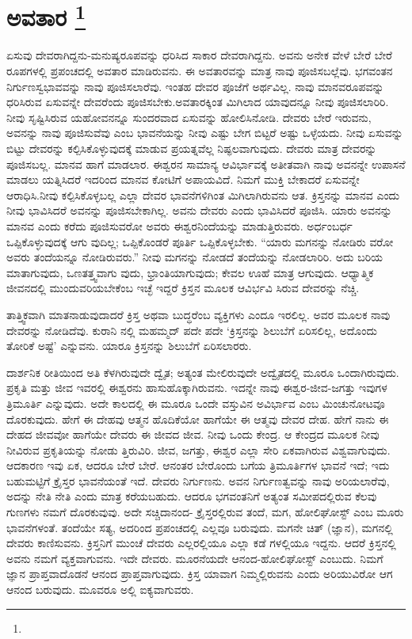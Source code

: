 
\chapter[ಅವತಾರ ]{ಅವತಾರ \protect\footnote{}}

ಏಸುವು ದೇವರಾಗಿದ್ದನು-ಮನುಷ್ಯರೂಪವನ್ನು ಧರಿಸಿದ ಸಾಕಾರ ದೇವರಾಗಿದ್ದನು. ಅವನು ಅನೇಕ ವೇಳೆ ಬೇರೆ ಬೇರೆ ರೂಪಗಳಲ್ಲಿ ಪ್ರಪಂಚದಲ್ಲಿ ಅವತಾರ ಮಾಡಿರುವನು. ಈ ಅವತಾರವನ್ನು ಮಾತ್ರ ನಾವು ಪೂಜಿಸಬಲ್ಲೆವು. ಭಗವಂತನ ನಿರ್ಗುಣಸ್ವಭಾವವನ್ನು ನಾವು ಪೂಜಿಸಲಾರೆವು. ಇಂತಹ ದೇವರ ಪೂಜೆಗೆ ಅರ್ಥವಿಲ್ಲ. ನಾವು ಮಾನವರೂಪವನ್ನು ಧರಿಸಿರುವ ಏಸುವನ್ನೇ ದೇವರೆಂದು ಪೂಜಿಸಬೇಕು.ಅವತಾರಕ್ಕಿಂತ ಮಿಗಿಲಾದ ಯಾವುದನ್ನೂ ನೀವು ಪೂಜಿಸಲಾರಿರಿ. ನೀವು ಸೃಷ್ಟಿಸಿರುವ ಯಹೋವನನ್ನೂ ಸುಂದರವಾದ ಏಸುವನ್ನು ಹೋಲಿಸಿನೋಡಿ. ದೇವರು ಬೇರೆ ಇರುವನು, ಅವನನ್ನು ನಾವು ಪೂಜಿಸುವೆವು ಎಂಬ ಭಾವನೆಯನ್ನು ನೀವು ಎಷ್ಟು ಬೇಗ ಬಿಟ್ಟರೆ ಅಷ್ಟು ಒಳ್ಳೆಯದು. ನೀವು ಏಸುವನ್ನು ಬಿಟ್ಟು ದೇವರನ್ನು ಕಲ್ಪಿಸಿಕೊಳ್ಳುವುದಕ್ಕೆ ಮಾಡುವ ಪ್ರಯತ್ನವೆಲ್ಲ ನಿಷ್ಫಲವಾಗುವುದು. ದೇವರು ಮಾತ್ರ ದೇವರನ್ನು ಪೂಜಿಸಬಲ್ಲ. ಮಾನವ ಹಾಗೆ ಮಾಡಲಾರ. ಈಶ್ವರನ ಸಾಮಾನ್ಯ ಆವಿರ್ಭಾವಕ್ಕೆ ಅತೀತವಾಗಿ ನಾವು ಅವನನ್ನೇ ಉಪಾಸನೆ ಮಾಡಲು ಯತ್ನಿಸಿದರೆ ಇದರಿಂದ ಮಾನವ ಕೋಟಿಗೆ ಅಪಾಯವಿದೆ. ನಿಮಗೆ ಮುಕ್ತಿ ಬೇಕಾದರೆ ಏಸುವನ್ನೇ ಆರಾಧಿಸಿ.ನೀವು ಕಲ್ಪಿಸಿಕೊಳ್ಳಬಲ್ಲ ಎಲ್ಲಾ ದೇವರ ಭಾವನೆಗಳಿಗಿಂತ ಮಿಗಿಲಾಗಿರುವನು ಆತ. ಕ್ರಿಸ್ತನನ್ನು ಮಾನವ ಎಂದು ನೀವು ಭಾವಿಸಿದರೆ ಅವನನ್ನು ಪೂಜಿಸಬೇಕಾಗಿಲ್ಲ. ಅವನು ದೇವರು ಎಂದು ಭಾವಿಸಿದರೆ ಪೂಜಿಸಿ. ಯಾರು ಅವನನ್ನು ಮಾನವ ಎಂದು ಕರೆದು ಪೂಜಿಸುವರೋ ಅವರು ಈಶ್ವರನಿಂದೆಯನ್ನು ಮಾಡುತ್ತಿರುವರು. ಅರ್ಧಂಬರ್ಧ ಒಪ್ಪಿಕೊಳ್ಳುವುದಕ್ಕೆ ಆಗು ವುದಿಲ್ಲ; ಒಪ್ಪಿಕೊಂಡರೆ ಪೂರ್ತಿ ಒಪ್ಪಿಕೊಳ್ಳಬೇಕು. “ಯಾರು ಮಗನನ್ನು ನೋಡಿರು ವರೋ ಅವರು ತಂದೆಯನ್ನೂ ನೋಡಿರುವರು.” ನೀವು ಮಗನನ್ನು ನೋಡದೆ ತಂದೆಯನ್ನು ನೋಡಲಾರಿರಿ. ಅದು ಬರಿಯ ಮಾತಾಗುವುದು, ಒಣತತ್ತ್ವವಾಗು ವುದು, ಭ್ರಾಂತಿಯಾಗುವುದು; ಕೇವಲ ಊಹೆ ಮಾತ್ರ ಆಗುವುದು. ಆಧ್ಯಾತ್ಮಿಕ ಜೀವನದಲ್ಲಿ ಮುಂದುವರಿಯಬೇಕೆಂಬ ಇಚ್ಛೆ ಇದ್ದರೆ ಕ್ರಿಸ್ತನ ಮೂಲಕ ಆವಿರ್ಭವಿ ಸಿರುವ ದೇವರನ್ನು ನೆಚ್ಚಿ.

ತಾತ್ತ್ವಿಕವಾಗಿ ಮಾತನಾಡುವುದಾದರೆ ಕ್ರಿಸ್ತ ಅಥವಾ ಬುದ್ಧರೆಂಬ ವ್ಯಕ್ತಿಗಳು ಎಂದೂ ಇರಲಿಲ್ಲ. ಅವರ ಮೂಲಕ ನಾವು ದೇವರನ್ನು ನೋಡಿದೆವು. ಕುರಾನಿ ನಲ್ಲಿ ಮಹಮ್ಮದ್​ ಪದೇ ಪದೇ ‘ಕ್ರಿಸ್ತನನ್ನು ಶಿಲುಬೆಗೆ ಏರಿಸಲಿಲ್ಲ, ಅದೊಂದು ತೋರಿಕೆ ಅಷ್ಟೆ’ ಎನ್ನುವನು. ಯಾರೂ ಕ್ರಿಸ್ತನನ್ನು ಶಿಲುಬೆಗೆ ಏರಿಸಲಾರರು.

ದಾರ್ಶನಿಕ ರೀತಿಯಿಂದ ಅತಿ ಕೆಳಗಿರುವುದೇ ದ್ವೈತ; ಅತ್ಯಂತ ಮೇಲಿರುವುದೇ ಅದ್ವೈತದಲ್ಲಿ ಮೂರೂ ಒಂದಾಗಿರುವುದು. ಪ್ರಕೃತಿ ಮತ್ತು ಜೀವ ಇವರಲ್ಲಿ ಈಶ್ವರನು ಹಾಸುಹೊಕ್ಕಾಗಿರುವನು. ಇದನ್ನೇ ನಾವು ಈಶ್ವರ-ಜೀವ-ಜಗತ್ತು ಇವುಗಳ ತ್ರಿಮೂರ್ತಿ ಎನ್ನುವುದು. ಅದೇ ಕಾಲದಲ್ಲಿ ಈ ಮೂರೂ ಒಂದೇ ವಸ್ತುವಿನ ಅವಿರ್ಭಾವ ಎಂಬ ಮಿಂಚುನೋಟವೂ ದೊರಕುವುದು. ಹೇಗೆ ಈ ದೇಹವು ಆತ್ಮನ ಹೊದಿಕೆಯೋ ಹಾಗೆಯೇ ಈ ಆತ್ಮವು ದೇವರ ದೇಹ. ಹೇಗೆ ನಾನು ಈ ದೇಹದ ಜೀವವೋ ಹಾಗೆಯೇ ದೇವರು ಈ ಜೀವದ ಜೀವ. ನೀವು ಒಂದು ಕೇಂದ್ರ. ಆ ಕೇಂದ್ರದ ಮೂಲಕ ನೀವು ನೀವಿರುವ ಪ್ರಕೃತಿಯನ್ನು ನೋಡು ತ್ತಿರುವಿರಿ. ಜೀವ, ಜಗತ್ತು, ಈಶ್ವರ ಎಲ್ಲಾ ಸೇರಿ ಏಕವಾಗಿರುವ ವಿಶ್ವವಾಗುವುದು. ಆದಕಾರಣ ಇವು ಏಕ, ಆದರೂ ಬೇರೆ ಬೇರೆ. ಆನಂತರ ಬೇರೊಂದು ಬಗೆಯ ತ್ರಿಮೂರ್ತಿಗಳ ಭಾವನೆ ಇದೆ; ಇದು ಬಹುಮಟ್ಟಿಗೆ ಕ್ರೈಸ್ತರ ಭಾವನೆಯಂತೆ ಇದೆ. ದೇವರು ನಿರ್ಗುಣನು. ಅವನ ನಿರ್ಗುಣತ್ವವನ್ನು ನಾವು ಅರಿಯಲಾರೆವು, ಅದನ್ನು ನೇತಿ ನೇತಿ ಎಂದು ಮಾತ್ರ ಕರೆಯಬಹುದು. ಆದರೂ ಭಗವಂತನಿಗೆ ಅತ್ಯಂತ ಸಮೀಪದಲ್ಲಿರುವ ಕೆಲವು ಗುಣಗಳು ನಮಗೆ ದೊರಕುವುವು. ಅದೇ ಸಚ್ಚಿದಾನಂದ- ಕ್ರೈಸ್ತರಲ್ಲಿರುವ ತಂದೆ, ಮಗ, ಹೋಲಿಘೋಸ್ಟ್​ ಎಂಬ ಮೂರು ಭಾವನೆಗಳಂತೆ. ತಂದೆಯೇ ಸತ್ಯ, ಅದರಿಂದ ಪ್ರಪಂಚದಲ್ಲಿ ಎಲ್ಲವೂ ಬರುವುದು. ಮಗನೇ ಚಿತ್​ (ಜ್ಞಾನ), ಮಗನಲ್ಲಿ ದೇವರು ಕಾಣಿಸುವನು. ಕ್ರಿಸ್ತನಿಗೆ ಮುಂಚೆ ದೇವರು ಎಲ್ಲರಲ್ಲಿಯೂ ಎಲ್ಲಾ ಕಡೆ ಗಳಲ್ಲಿಯೂ ಇದ್ದನು. ಆದರೆ ಕ್ರಿಸ್ತನಲ್ಲಿ ಅವನು ನಮಗೆ ವ್ಯಕ್ತವಾಗುವನು. ಇದೇ ದೇವರು. ಮೂರನೆಯದೇ ಆನಂದ-ಹೋಲಿಘೋಸ್ಟ್​ ಎಂಬುದು. ನಿಮಗೆ ಜ್ಞಾನ ಪ್ರಾಪ್ತವಾದೊಡನೆ ಆನಂದ ಪ್ರಾಪ್ತವಾಗುವುದು. ಕ್ರಿಸ್ತ ಯಾವಾಗ ನಿಮ್ಮಲ್ಲಿರುವನು ಎಂದು ಅರಿಯುವಿರೋ ಆಗ ಆನಂದ ಬರುವುದು. ಮೂವರೂ ಅಲ್ಲಿ ಐಕ್ಯವಾಗುವರು.


